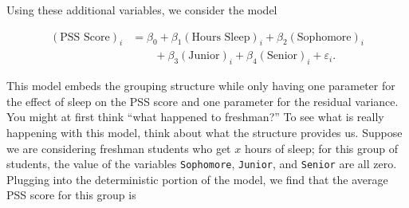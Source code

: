 \documentclass[
]{book}
\theoremstyle{plain}
\theoremstyle{mydefn}
\theoremstyle{myexmpl}
\theoremstyle{remark}
\begin{document}
\begin{table}

\caption{\label{tab:glm-categorical-predictors-stress-data-aug}Hypothetical data on stress in college students augmented to include additional variables capturing the class standing.}
\centering
{}
\end{table}

Using these additional variables, we consider the model

\[
\begin{aligned}
  (\text{PSS Score})_i &= \beta_0 + \beta_1 (\text{Hours Sleep})_i + \beta_2 (\text{Sophomore})_i \\
    &\qquad + \beta_3 (\text{Junior})_i + \beta_4 (\text{Senior})_i + \varepsilon_i.
\end{aligned}
\]

This model embeds the grouping structure while only having one parameter for the effect of sleep on the PSS score and one parameter for the residual variance. You might at first think ``what happened to freshman?'' To see what is really happening with this model, think about what the structure provides us. Suppose we are considering freshman students who get \(x\) hours of sleep; for this group of students, the value of the variables \texttt{Sophomore}, \texttt{Junior}, and \texttt{Senior} are all zero. Plugging into the deterministic portion of the model, we find that the average PSS score for this group is
\end{document}
